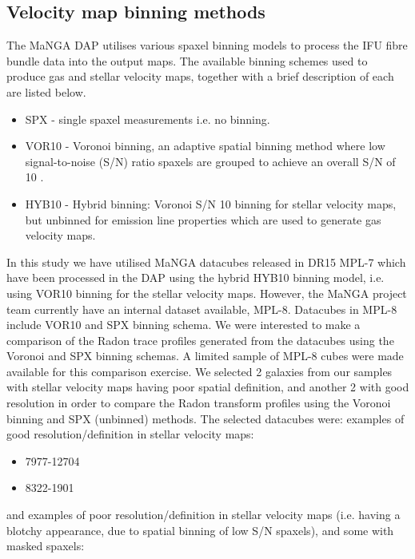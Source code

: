 \subsection{Velocity map binning methods}
\label{sec:binning-methods}
The MaNGA DAP utilises various spaxel binning models to process the IFU fibre bundle data into the output maps. The available binning schemes used to produce gas and stellar velocity maps, together with a brief description of each are listed below.

\begin{itemize}
    \item SPX - single spaxel measurements i.e. no binning.
    \item VOR10 - Voronoi binning, an adaptive spatial binning method where low signal-to-noise (S/N) ratio spaxels are grouped to achieve an overall S/N of 10  \citep{2003MNRAS.342..345C, 2019arXiv190100856W}.
    \item HYB10 - Hybrid binning: Voronoi S/N 10 binning for stellar velocity maps, but unbinned for emission line properties which are used to generate gas velocity maps.
\end{itemize}  

In this study we have utilised MaNGA datacubes released in DR15 MPL-7 which have been processed in the DAP using the hybrid HYB10 binning model, i.e. using VOR10 binning for the stellar velocity maps. However, the MaNGA project team currently have an internal dataset available, MPL-8. Datacubes in MPL-8 include VOR10 and SPX binning schema. We were interested to make a comparison of the Radon trace profiles generated from the datacubes using the Voronoi and SPX binning schemas. A limited sample of MPL-8 cubes were made available for this comparison exercise. We selected 2 galaxies from our samples with stellar velocity maps having poor spatial definition, and another 2 with good resolution in order to compare the Radon transform profiles using the Voronoi binning and SPX (unbinned) methods. The selected datacubes were: examples of good resolution/definition in stellar velocity maps:

\begin{itemize}
    \item 7977-12704
    \item 8322-1901
\end{itemize}

and examples of poor resolution/definition in stellar velocity maps (i.e. having a blotchy appearance, due to spatial binning of low S/N spaxels), and some with masked spaxels:

